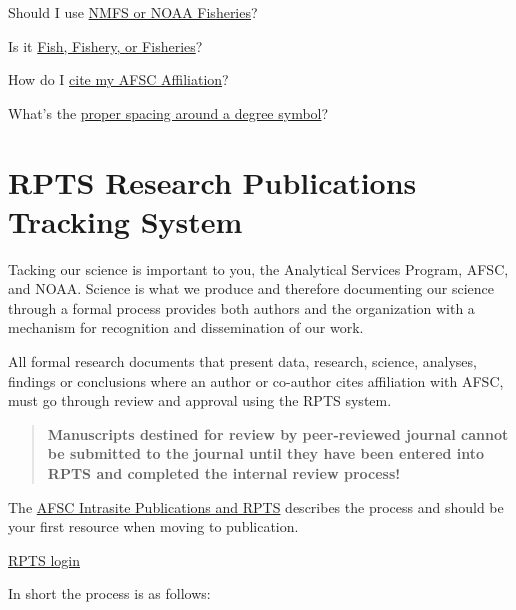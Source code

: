 \documentclass[
  letterpaper,
  DIV=11,
  numbers=noendperiod]{scrreprt}
\begin{document}
Should I use
\href{https://drive.google.com/file/d/0B-F6OHsoRmTkRzRlbFNXZUU2aGc/view?resourcekey=0-8ApYb_ovfYVj4pLKifk_lg}{NMFS
or NOAA Fisheries}?

Is it
\href{https://sites.google.com/noaa.gov/myafsc/communications/publications-and-rpts/sorting-fish}{Fish,
Fishery, or Fisheries}?

How do I
\href{https://sites.google.com/noaa.gov/myafsc/communications/publications-and-rpts/citing-affiliation}{cite
my AFSC Affiliation}?

What's the
\href{https://techwritertemplates.com/documentation/reference/spacing-the-degree-symbol/}{proper
spacing around a degree symbol}?

\section{RPTS Research Publications Tracking
System}\label{rpts-research-publications-tracking-system}

Tacking our science is important to you, the Analytical Services
Program, AFSC, and NOAA. Science is what we produce and therefore
documenting our science through a formal process provides both authors
and the organization with a mechanism for recognition and dissemination
of our work.

All formal research documents that present data, research, science,
analyses, findings or conclusions where an author or co-author cites
affiliation with AFSC, must go through review and approval using the
RPTS system.

\begin{quote}
\textbf{Manuscripts destined for review by peer-reviewed journal cannot
be submitted to the journal until they have been entered into RPTS and
completed the internal review process!}
\end{quote}

The
\href{https://sites.google.com/noaa.gov/myafsc/communications/publications-and-rpts}{AFSC
Intrasite Publications and RPTS} describes the process and should be
your first resource when moving to publication.

\href{https://apps-st.fisheries.noaa.gov/rpts/\#view=login}{RPTS login}

In short the process is as follows:
\end{document}
